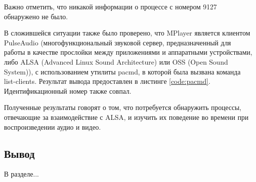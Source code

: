 Важно отметить, что никакой информации о процессе с номером 9127 обнаружено не было.

В сложившейся ситуации также было проверено, что MPlayer является клиентом PulseAudio (многофункциональный звуковой сервер, предназначенный для работы в качестве прослойки между приложениями и аппаратными устройствами, либо ALSA (Advanced Linux Sound Architecture) или OSS (Open Sound System)), с использованием утилиты pacmd, в которой была вызвана команда list-clients. Результат вывода предоставлен в листинге \ref{code:pacmd}. Идентификационный номер также совпал.


Полученные результаты говорят о том, что потребуется обнаружить процессы, отвечающие за взаимодействие с ALSA, и изучить их поведение во времени при воспроизведении аудио и видео.

\subsection*{Вывод}
В разделе...
